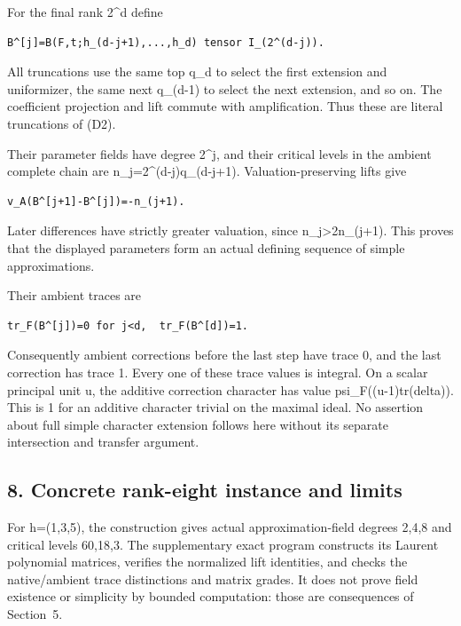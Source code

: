 For the final rank 2\^{}d define

\begin{Verbatim}[fontsize=\small,breaklines=true,breakanywhere=true]
B^[j]=B(F,t;h_(d-j+1),...,h_d) tensor I_(2^(d-j)).
\end{Verbatim}

All truncations use the same top q\_d to select the first extension and
uniformizer, the same next q\_(d-1) to select the next extension, and so
on. The coefficient projection and lift commute with amplification. Thus
these are literal truncations of (D2).

Their parameter fields have degree 2\^{}j, and their critical levels in
the ambient complete chain are n\_j=2\^{}(d-j)q\_(d-j+1).
Valuation-preserving lifts give

\begin{Verbatim}[fontsize=\small,breaklines=true,breakanywhere=true]
v_A(B^[j+1]-B^[j])=-n_(j+1).
\end{Verbatim}

Later differences have strictly greater valuation, since
n\_j\textgreater2n\_(j+1). This proves that the displayed parameters
form an actual defining sequence of simple approximations.

Their ambient traces are

\begin{Verbatim}[fontsize=\small,breaklines=true,breakanywhere=true]
tr_F(B^[j])=0 for j<d,  tr_F(B^[d])=1.
\end{Verbatim}

Consequently ambient corrections before the last step have trace 0, and
the last correction has trace 1. Every one of these trace values is
integral. On a scalar principal unit u, the additive correction
character has value psi\_F((u-1)tr(delta)). This is 1 for an additive
character trivial on the maximal ideal. No assertion about full simple
character extension follows here without its separate intersection and
transfer argument.

\hypertarget{dyadic_tower-concrete-rank-eight-instance-and-limits}{%
\subsection{8. Concrete rank-eight instance and
limits}\label{dyadic_tower-concrete-rank-eight-instance-and-limits}}

For h=(1,3,5), the construction gives actual approximation-field degrees
2,4,8 and critical levels 60,18,3. The supplementary exact program
constructs its Laurent polynomial matrices, verifies the normalized lift
identities, and checks the native/ambient trace distinctions and matrix
grades. It does not prove field existence or simplicity by bounded
computation: those are consequences of Section~5.

